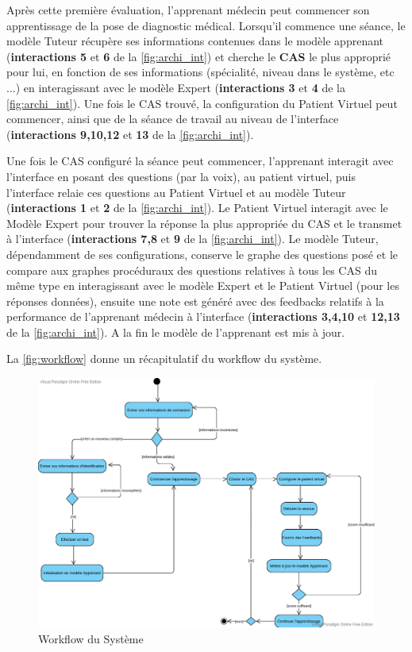 Après cette première évaluation, l'apprenant médecin peut commencer son apprentissage de la pose de diagnostic médical. Lorsqu'il commence une séance, le modèle Tuteur récupère ses informations contenues dans le modèle apprenant (\textbf{interactions 5} et \textbf{6} de la \autoref{fig:archi_int}) et cherche le \textbf{CAS} le plus approprié pour lui, en fonction de ses informations (spécialité, niveau dans le système, etc ...) en interagissant avec le modèle Expert (\textbf{interactions 3} et \textbf{4} de la \autoref{fig:archi_int}). Une fois le CAS trouvé, la configuration du Patient Virtuel peut commencer, ainsi que de la séance de travail au niveau de l'interface (\textbf{interactions 9,10,12} et \textbf{13} de la \autoref{fig:archi_int}).

Une fois le CAS configuré la séance peut commencer, l'apprenant interagit avec l'interface en posant des questions (par la voix), au patient virtuel, puis l'interface relaie ces questions au Patient Virtuel et au modèle Tuteur (\textbf{interactions 1} et \textbf{2} de la \autoref{fig:archi_int}). Le Patient Virtuel interagit avec le Modèle Expert pour trouver la réponse la plus appropriée du CAS et le transmet à l'interface (\textbf{interactions 7,8} et \textbf{9} de la \autoref{fig:archi_int}). Le modèle Tuteur, dépendamment de ses configurations, conserve le graphe des questions posé et le compare aux graphes procéduraux des questions relatives à tous les CAS du même type en interagissant avec le modèle Expert et le Patient Virtuel (pour les réponses données), ensuite une note est généré avec des feedbacks relatifs à la performance de l'apprenant médecin à l'interface  (\textbf{interactions 3,4,10} et \textbf{12,13} de la \autoref{fig:archi_int}). A la fin le modèle de l'apprenant est mis à jour.

La \autoref{fig:workflow} donne un récapitulatif du workflow du système.



\begin{figure}[H]
        \centering
        \includegraphics[width=\textwidth]{figures/worflow_STI.png}
        \captionsetup{justification=centering}
        \caption{Workflow du Système}
        \label{fig:workflow}
\end{figure}



